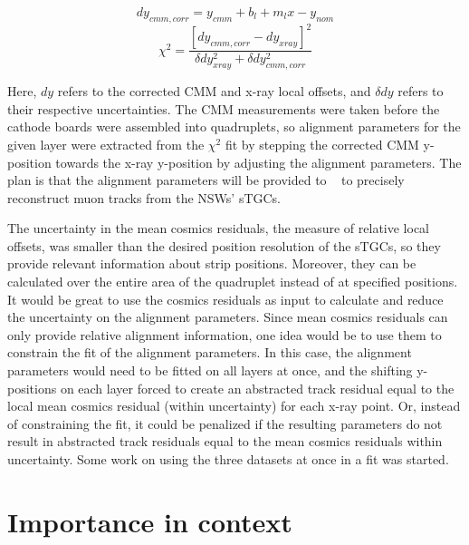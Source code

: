 \begin{equation}
    dy_{cmm, corr} = y_{cmm} + b_l + m_{l}x - y_{nom}
    \label{eqn:dy_cmm_corr}
\end{equation}
\begin{equation}
    \chi^2 = \frac{\left[dy_{cmm, corr} - dy_{xray}\right]^2}{\delta dy_{xray}^2 + \delta dy_{cmm, corr}^2}
    \label{eqn:chi2}  
\end{equation}

Here, $dy$ refers to the corrected CMM and x-ray local offsets, and $\delta dy$ refers to their respective uncertainties. The CMM measurements were taken before the cathode boards were assembled into quadruplets, so alignment parameters for the given layer were extracted from the $\chi^2$ fit by stepping the corrected CMM y-position towards the x-ray y-position by adjusting the alignment parameters. The plan is that the alignment parameters will be provided to ~\cite{the_atlas_collaboration_athena} to precisely reconstruct muon tracks from the NSWs' sTGCs.

The uncertainty in the mean cosmics residuals, the measure of relative local offsets, was smaller than the desired position resolution of the sTGCs, so they provide relevant information about strip positions. Moreover, they can be calculated over the entire area of the quadruplet instead of at specified positions. It would be great to use the cosmics residuals as input to calculate and reduce the uncertainty on the alignment parameters. Since mean cosmics residuals can only provide relative alignment information, one idea would be to use them to constrain the fit of the alignment parameters. In this case, the alignment parameters would need to be fitted on all layers at once, and the shifting y-positions on each layer forced to create an abstracted track residual equal to the local mean cosmics residual (within uncertainty) for each x-ray point. Or, instead of constraining the fit, it could be penalized if the resulting parameters do not result in abstracted track residuals equal to the mean cosmics residuals within uncertainty. Some work on using the three datasets at once in a fit was started.


\section{Importance in context}
\label{sec:importance}

